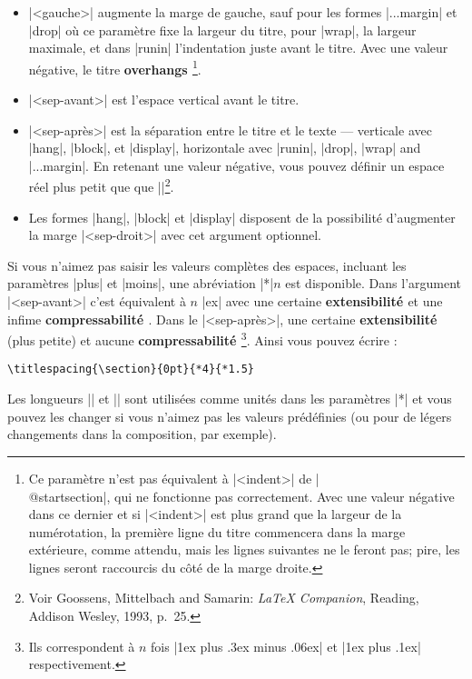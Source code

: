 \documentclass[a4paper]{ltxguide}
\newcommand{\trad}[1]{\textbf{\textcolor{orange5}{\noindent\ding{54} #1 \ding{54}}}}
\def\gobble#1{}
\def\cs#1{\expandafter\gobble\string\\#1}
\begin{document}
\begin{itemize}
\item |<gauche>| augmente la marge de gauche, sauf pour les formes |...margin| 
et |drop| où ce paramètre fixe la largeur du titre, pour |wrap|, la largeur 
maximale, et dans |runin| l'indentation juste avant le titre. Avec une 
valeur négative, le titre \trad{overhangs} \footnote{Ce paramètre n'est pas 
équivalent à |<indent>| de |\cs{@startsection}|, qui ne fonctionne pas 
correctement. Avec une valeur négative dans ce dernier et si |<indent>| est
plus grand que la largeur de la numérotation, la première ligne du titre 
commencera dans la marge extérieure, comme attendu, mais les lignes suivantes 
ne le feront pas; pire, les lignes seront raccourcis du côté de la marge 
droite.}.

\item |<sep-avant>| est l'espace vertical avant le titre.

\item |<sep-après>| est la séparation entre le titre et le texte --- verticale 
avec |hang|, |block|, et |display|, horizontale avec |runin|, |drop|, |wrap| 
and |...margin|. En retenant une valeur négative, vous pouvez définir un
espace réel plus petit que que |\parskip|\footnote{Voir  
Goossens, Mittelbach and Samarin: \textit{\LaTeX{} Companion}, 
Reading, Addison Wesley, 1993, p.~25.}.

\item Les formes |hang|, |block| et |display| disposent de la possibilité 
d'augmenter la marge |<sep-droit>| avec cet argument optionnel.
\end{itemize}

Si vous n'aimez pas saisir les valeurs complètes des espaces, incluant les
paramètres |plus| et |moins|, une abréviation |*|$n$ est disponible. Dans 
l'argument |<sep-avant>| c'est équivalent à $n$ |ex| avec une certaine 
\trad{extensibilité} et une infime \trad{compressabilité}. Dans le |<sep-après>|, une 
certaine \trad{extensibilité} (plus petite) et aucune \trad{compressabilité}\footnote{Ils
correspondent à $n$ fois |1ex plus .3ex minus .06ex| et |1ex plus .1ex|
respectivement.}. Ainsi vous pouvez écrire :
\begin{verbatim}
\titlespacing{\section}{0pt}{*4}{*1.5}
\end{verbatim}
Les longueurs |\beforetitleunit| et |\aftertitleunit| sont utilisées 
comme unités dans les paramètres |*| et vous pouvez les changer si vous
n'aimez pas les valeurs prédéfinies (ou pour de légers changements dans 
la composition, par exemple).
\end{document}
